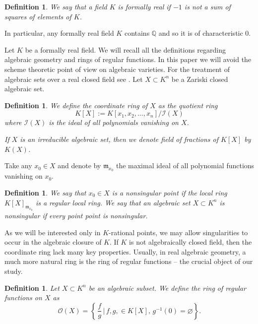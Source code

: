 \documentclass[12pt,reqno]{amsart}   	%
\newtheorem{df}[thm]{Definition}
\theoremstyle{obs}
\theoremstyle{prob}
\theoremstyle{conj}
\theoremstyle{remark}
\newcommand{\OO}{\mathcal{O}}
\begin{document}
\begin{df}
We say that a field $K$ is formally real if $-1$ is not a sum of squares of elements of $K$.

\end{df}

In particular, any formally real field $K$ contains $\mathbb{Q}$ and so it is of characteristic $0$.

Let $K$ be a formally real field. We will recall all the definitions regarding algebraic geometry and rings of regular functions. In this paper we will avoid the scheme theoretic point of view on algebraic varieties.
For the treatment of algebraic sets over a real closed field see \cite[Chapter 3]{bcr1998}. Let $X \subset K^n$ be a Zariski closed algebraic set.
\begin{df}
We define the coordinate ring of $X$ as the quotient ring 
$$K[X]:=K[x_1,x_2,\dots, x_n]/\mathcal{I}(X)$$
 where $\mathcal{I}(X)$ is the ideal of all polynomials vanishing on $X$.

 
If $X$ is an irreducible algebraic set, then we denote field of fractions of $K[X]$ by $K(X)$.
\end{df}

Take any $x_0\in X$ and denote by $\mathfrak{m}_{x_0}$ the maximal ideal of all polynomial functions vanishing on $x_0$.

\begin{df}
We say that $x_0 \in X$ is a nonsingular point if the local ring $K[X]_{\mathfrak{m}_{x_0}}$ is a regular local ring.  
We say that an algebraic set $X\subset K^n$ is nonsingular if every point point is nonsingular.

\end{df}



As we will be interested only in $K$-rational points, we may allow singularities to occur in the algebraic closure of $K$. If $K$ is not algebraically closed field, then the coordinate ring lack many key properties. Usually, in real algebraic geometry, a much more natural ring is the ring of regular functions -- the crucial object of our study.

\begin{df}
Let $X \subset K^n$ be an algebraic subset. We define the ring of regular functions on $X$ as 
$$\OO(X)= \left \{ \,  \frac{f}{g} \,  | \,  f,g,\in K[X], \, g^{-1}(0)=\varnothing  \right\}.$$

\end{df}
\end{document}
